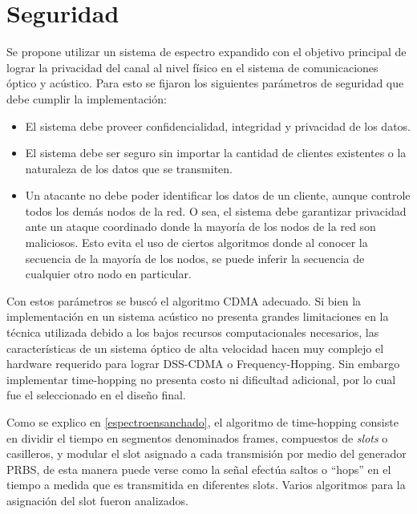 \section{Seguridad}
\label{Seguridad}

Se propone utilizar un sistema de espectro expandido con el objetivo principal de lograr la privacidad del canal al nivel físico en el sistema de comunicaciones óptico y acústico.
Para esto se fijaron los siguientes parámetros de seguridad que debe cumplir la implementación:

\begin{itemize}
 \item El sistema debe proveer confidencialidad, integridad y privacidad de los datos.
 \item El sistema debe ser seguro sin importar la cantidad de clientes existentes o la naturaleza de los datos que se transmiten.
 \item Un atacante no debe poder identificar los datos de un cliente, aunque controle todos los demás nodos de la red. O sea, el sistema debe garantizar privacidad ante un ataque coordinado donde la mayoría de los nodos de la red son maliciosos. Esto evita el uso de ciertos algoritmos \cite{gold1967optimal} donde al conocer la secuencia de la mayoría de los nodos, se puede inferir la secuencia de cualquier otro nodo en particular.
\end{itemize}

Con estos parámetros se buscó el algoritmo CDMA adecuado. Si bien la implementación en un sistema acústico no presenta grandes limitaciones en la técnica utilizada debido a los bajos recursos computacionales necesarios, las características de un sistema óptico de alta velocidad hacen muy complejo el hardware requerido para lograr DSS-CDMA o Frequency-Hopping. Sin embargo implementar time-hopping no presenta costo ni dificultad adicional, por lo cual fue el seleccionado en el diseño final.

Como se explico en \ref{espectroensanchado}, el algoritmo de time-hopping consiste en dividir el tiempo en segmentos denominados frames, compuestos de \textit{slots} o casilleros, y modular el slot asignado a cada transmisión por medio del generador PRBS, de esta manera puede verse como la señal efectúa saltos o ``hops'' en el tiempo a medida que es transmitida en diferentes slots. Varios algoritmos para la asignación del slot fueron analizados. 

